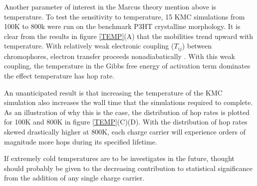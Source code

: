 Another parameter of interest in the Marcus theory mention above is temperature. To test the sensitivity to
temperature, 15 KMC simulations from 100K to 800k were run on the benchmark P3HT crystalline morphology. It
is clear from the results in figure \ref{TEMP}(A) that the mobilities trend upward with temperature. With relatively
weak electronic coupling ($T_{ij}$) between chromophores, electron transfer proceeds nonadiabatically
\cite{clarke2010}. With this weak coupling, the temperature in the Gibbs free energy of activation term
dominates the effect temperature has hop rate.

An unanticipated result is that increasing the temperature of the KMC
simulation also increases the wall time that the simulations required to
complete. As an illustration of why this is the case, the distribution of hop
rates is plotted for 100K and 800K in figure \ref{TEMP}(C)(D). With the distribution of hop rates skewed
drastically higher at 800K, each charge carrier will experience orders of
magnitude more hops during its specified lifetime. 

If extremely cold
temperatures are to be investigates in the future, thought should probably be given to
the decreasing contribution to statistical significance from the addition of
any single charge carrier. 



